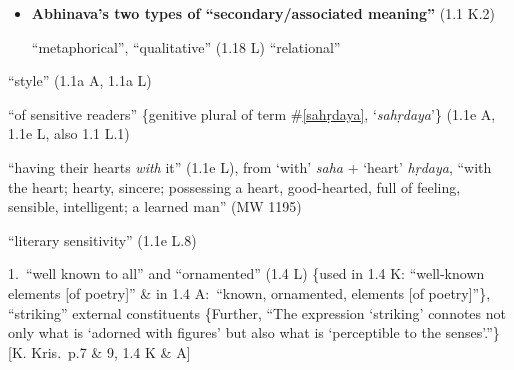 \documentclass[10pt]{article}
\begin{document}
\begin{multicols}{2}
\begin{enumerate}[
			leftmargin=0em,
			rightmargin=0em,
		]
\begin{itemize}
			\item \textbf{Abhinava's two types of ``secondary\-/associated meaning''} (1.1 K.2)
			      \begin{enumerate}
				       ``metaphorical'', ``qualitative'' (1.18 L)
				       ``relational''%
			      \end{enumerate}
		\end{itemize}



		 ``style'' (1.1a A, 1.1a L)

		 ``of sensitive readers'' \{genitive plural of term \#\ref{sahṛdaya}, `\textit{sahṛdaya}'\} (1.1e A, 1.1e L, also 1.1 L.1)

		 ``having their hearts \textit{with} it'' (1.1e L),
		from `with' \textit{saha} + `heart' \textit{hṛdaya},
		``with the heart; hearty, sincere; possessing a heart, good-hearted, full of feeling, sensible, intelligent; a learned man'' (MW 1195)
		
		 ``literary sensitivity'' (1.1e L.8)


		 1.\ ``well known to all'' and ``ornamented'' (1.4 L) \{used in 1.4 K: ``well-known elements [of poetry]'' \& in 1.4 A:\ ``known, ornamented, elements [of poetry]''\},
		``striking'' external constituents \{Further, ``The expression `striking' connotes not only what is `adorned with figures' but also what is `perceptible to the senses'.''\} [K. Kris.\ p.7 \& 9, 1.4 K \& A]


\end{enumerate}
\end{multicols}
\end{document}
